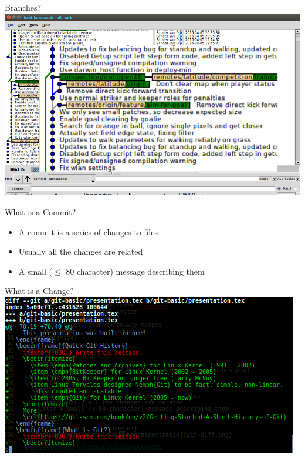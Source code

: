 \documentclass{beamer}
\begin{document}
  \begin{frame}{Branches?}
    \centering
    \includegraphics[scale=0.3,keepaspectratio]{gitk-branches.png}
  \end{frame}
  \begin{frame}{What is a Commit?}
    \begin{itemize}
      \item A commit is a series of changes to files
      \item Usually all the changes are related
      \item A small ($ \leqslant $ 80 character) message describing them
    \end{itemize}
  \end{frame}
  \begin{frame}{What is a Change?}
    \centering
    \includegraphics[scale=0.5,keepaspectratio]{git-diff.png}
  \end{frame}
\end{document}
